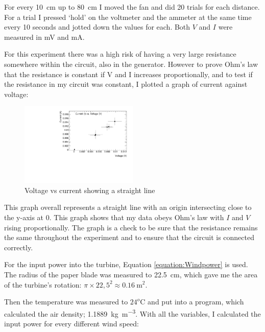 \documentclass[12pt]{article}
\begin{document}
For every \SI{10}{\centi\metre} up to \SI{80}{\centi\metre} I moved the fan and did 20 trials for each distance.
For a trial I pressed `hold' on the voltmeter and the ammeter at the same time every 10 seconds and jotted down the values for each.
Both $V$ and $I$ were measured in \si{\milli\volt} and \si{\milli\ampere}.

For this experiment there was a high risk of having a very large resistance somewhere within the circuit, also in the generator.
However to prove Ohm's law that the resistance is constant if V and I increases proportionally, and to test if the resistance in my circuit was constant, I plotted a graph of current against voltage:

\begin{figure}[h]
\centering
\includegraphics[width=0.5\textwidth]{img/OhmsLaw.pdf}
\caption{Voltage vs current showing a straight line}
\label{figure:OhmsLaw}
\end{figure}

This graph overall represents a straight line with an origin intersecting close to the y-axis at 0.
This graph shows that my data obeys Ohm's law with $I$ and $V$ rising proportionally.
The graph is a check to be sure that the resistance remains the same throughout the experiment and to ensure that the circuit is connected correctly.

For the input power into the turbine, Equation \ref{equation:Windpower} is used.
The radius of the paper blade was measured to \SI{22,5}{\centi\metre}, which gave me the area of the turbine's rotation: $\pi \times 22,5^2 \approx \SI{0,16}{\metre\squared}$.

Then the temperature was measured to $24^o$C and put into a program\cite{AirDensityCalculator}, which calculated the air density; \SI{1,1889}{\kilo\gram\per\metre\cubed}.
With all the variables, I calculated the input power for every different wind speed:
\end{document}
